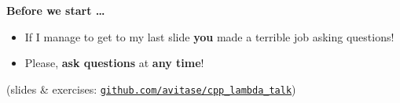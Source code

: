 \begin{frame}
    \textbf{Before we start \ldots}
    \begin{itemize}
        \item If I manage to get to my last slide \textbf{you} made a terrible job asking questions!
        \item Please, \textbf{ask questions} at \textbf{any time}!
    \end{itemize}

    \vspace{10mm}

    \centering
    (slides \& exercises: \href{https://github.com/avitase/cpp_lambda_talk}{\texttt{github.com/avitase/cpp\_lambda\_talk}})
\end{frame}
